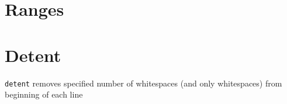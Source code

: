 \hypertarget{ranges}{%
\section{Ranges}\label{ranges}}

\begin{Shaded}
\begin{Highlighting}[numbers=left,,firstnumber=7,]
 \OperatorTok{(}\OperatorTok{,}\OperatorTok{)}
  \OperatorTok{:}\OperatorTok{(}\OperatorTok{,}\OperatorTok{):}\OperatorTok{(}\OperatorTok{,}\OperatorTok{)} \OperatorTok{:}\OperatorTok{(}\OperatorTok{+}\OperatorTok{)}
\end{Highlighting}
\end{Shaded}

\begin{Shaded}
\begin{Highlighting}[numbers=left,,firstnumber=7,]
 \OperatorTok{(}\OperatorTok{,}\OperatorTok{)}
  \OperatorTok{:}\OperatorTok{(}\OperatorTok{,}\OperatorTok{):}\OperatorTok{(}\OperatorTok{,}\OperatorTok{)} \OperatorTok{:}\OperatorTok{(}\OperatorTok{+}\OperatorTok{)}
\end{Highlighting}
\end{Shaded}

\hypertarget{detent}{%
\section{Detent}\label{detent}}

\texttt{detent} removes specified number of whitespaces (and only
whitespaces) from beginning of each line

\begin{Shaded}
\begin{Highlighting}[numbers=left,,firstnumber=8,]
\OperatorTok{:}\OperatorTok{(}\OperatorTok{,}\OperatorTok{):}\OperatorTok{(}\OperatorTok{,}\OperatorTok{)} \OperatorTok{:}\OperatorTok{(}\OperatorTok{+}\OperatorTok{)}
\end{Highlighting}
\end{Shaded}

\begin{Shaded}
\begin{Highlighting}[numbers=left,,firstnumber=61,]
\OperatorTok{\{}\OperatorTok{=}\OperatorTok{\}}
\end{Highlighting}
\end{Shaded}
